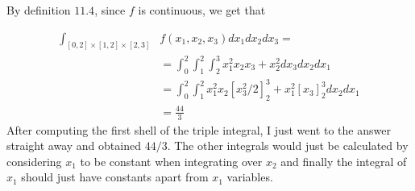 
By definition $ 11.4$, since $ f $ is continuous, we get that

\begin{align*}
    \int_{[0,2] \times [1,2] \times [2,3]}^{}& f(x_1, x_2, x_3) dx_1 dx_2 dx_3 =\\
					     &= \int_{0}^{2} \int_{1}^{2} \int_{2}^{3} x_1^2x_2x_3 +
					     x_2^2 dx_3 dx_2 dx_1\\
					     &= \int_{0}^{2} \int_{1}^{2} x_1^2 x_2
					     [x_3^2/2]_{2}^{3} + x_1^2 [x_3]_{2}^{3} dx_2 dx_1\\
					     &= \frac{44}{3} 
\end{align*}
After computing the first shell of the triple integral, I just went to the answer straight away and
obtained $ 44/3$. The other integrals would just be calculated by considering $ x_1$ to be constant
when integrating over $ x_2$ and finally the integral of $ x_1	$ should just have constants apart
from $ x_1$ variables.
